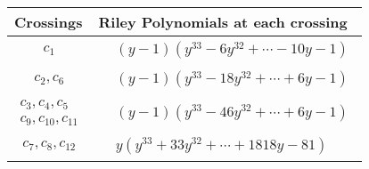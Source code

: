 \documentclass[1p]{elsarticle_modified}
\theoremstyle{definition}
\begin{document}
\begin{tabular}{m{50pt}|m{274pt}}
Crossings & \hspace{64pt}Riley Polynomials at each crossing \\
\hline $$\begin{aligned}c_{1}\end{aligned}$$&$\begin{aligned}
&(y-1)(y^{33}-6 y^{32}+\cdots-10 y-1)
\end{aligned}$\\
\hline $$\begin{aligned}c_{2},c_{6}\end{aligned}$$&$\begin{aligned}
&(y-1)(y^{33}-18 y^{32}+\cdots+6 y-1)
\end{aligned}$\\
\hline $$\begin{aligned}c_{3},c_{4},c_{5}\\c_{9},c_{10},c_{11}\end{aligned}$$&$\begin{aligned}
&(y-1)(y^{33}-46 y^{32}+\cdots+6 y-1)
\end{aligned}$\\
\hline $$\begin{aligned}c_{7},c_{8},c_{12}\end{aligned}$$&$\begin{aligned}
&y(y^{33}+33 y^{32}+\cdots+1818 y-81)
\end{aligned}$\\
\hline
\end{tabular}
\vskip 2pc
\end{document}
